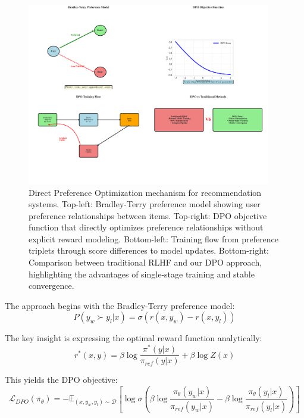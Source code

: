 \documentclass[pdflatex,sn-mathphys-num]{sn-jnl}%
\theoremstyle{thmstyleone}%
\theoremstyle{thmstyletwo}%
\theoremstyle{thmstylethree}%
\begin{document}
\begin{figure}[H]
\centering
\includegraphics[width=0.95\textwidth]{figures/dpo_mechanism_new.pdf}
\caption{Direct Preference Optimization mechanism for recommendation systems. Top-left: Bradley-Terry preference model showing user preference relationships between items. Top-right: DPO objective function that directly optimizes preference relationships without explicit reward modeling. Bottom-left: Training flow from preference triplets through score differences to model updates. Bottom-right: Comparison between traditional RLHF and our DPO approach, highlighting the advantages of single-stage training and stable convergence.}
\label{fig:dpo_mechanism}
\end{figure}

The approach begins with the Bradley-Terry preference model:
\begin{equation}
P(y_w \succ y_l | x) = \sigma(r(x, y_w) - r(x, y_l))
\end{equation}

The key insight is expressing the optimal reward function analytically:
\begin{equation}
r^*(x, y) = \beta \log \frac{\pi^*(y|x)}{\pi_{ref}(y|x)} + \beta \log Z(x)
\end{equation}

This yields the DPO objective:
\begin{equation}
\mathcal{L}_{DPO}(\pi_\theta) = -\mathbb{E}_{(x,y_w,y_l) \sim \mathcal{D}} \left[ \log \sigma\left(\beta \log \frac{\pi_\theta(y_w|x)}{\pi_{ref}(y_w|x)} - \beta \log \frac{\pi_\theta(y_l|x)}{\pi_{ref}(y_l|x)}\right) \right]
\end{equation}
\end{document}
